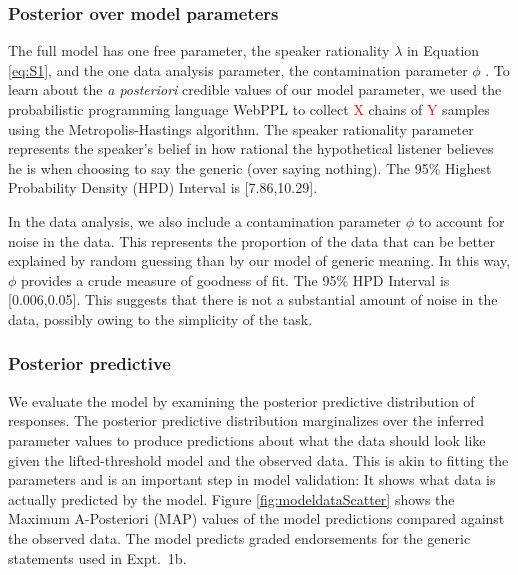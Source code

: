 \documentclass[10pt,letterpaper]{article}
\newcommand{\red}[1]{\textcolor{Red}{#1}}
\begin{document}
\subsubsection{Posterior over model parameters}

The full model has one free parameter, the speaker rationality $\lambda$ in Equation \ref{eq:S1}, and the one data analysis parameter, the contamination parameter $\phi$ .
To learn about the \emph{a posteriori} credible values of our model parameter, we used the probabilistic programming language WebPPL \cite{dippl} to collect \red{X} chains of \red{Y} samples using the Metropolis-Hastings algorithm. 
The speaker rationality parameter represents the speaker's belief in how rational the hypothetical listener believes he is when choosing to say the generic (over saying nothing). 
The 95\% Highest Probability Density (HPD) Interval is [7.86,10.29].

In the data analysis, we also include a contamination parameter $\phi$ to account for noise in the data.  
This represents the proportion of the data that can be better explained by random guessing than by our model of generic meaning.
In this way, $\phi$ provides a crude measure of goodness of fit. 
The 95\% HPD Interval is [0.006,0.05]. 
This suggests that there is not a substantial amount of noise in the data, possibly owing to the simplicity of the task. 



\subsubsection{Posterior predictive}

We evaluate the model by examining the posterior predictive distribution of responses. The posterior predictive distribution marginalizes over the inferred parameter values to produce predictions about what the data should look like given the lifted-threshold model and the observed data. This is akin to fitting the parameters and is an important step in model validation: It shows what data is actually predicted by the model. 
Figure \ref{fig:modeldataScatter} shows the Maximum A-Posteriori (MAP) values of the model predictions compared against the observed data. 
The model predicts graded endorsements for the generic statements used in Expt.~1b. 
\end{document}
